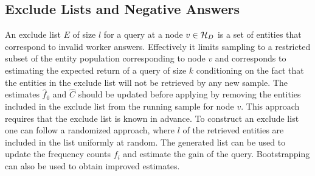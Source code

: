 
\subsection{Exclude Lists and Negative Answers}
\label{sec:excludelist}
An exclude list $E$ of size $l$ for a query at a node $v \in \mathcal{H}_D$ is a set of entities that correspond to invalid worker answers. Effectively it limits sampling to a restricted subset of the entity population corresponding to node $v$ and corresponds to estimating the expected return of a query of size $k$ conditioning on the fact that the entities in the exclude list will not be retrieved by any new sample. The estimates $\hat{f}_0$ and $\hat{C}$ should be updated before applying  by removing the entities included in the exclude list from the running sample for node $v$. This approach requires that the exclude list is known in advance. To construct an exclude list one can follow a randomized approach, where $l$ of the retrieved entities are included in the list uniformly at random. The generated list can be used to update the frequency counts $f_i$ and estimate the gain of the query. Bootstrapping can also be used to obtain improved estimates. 

